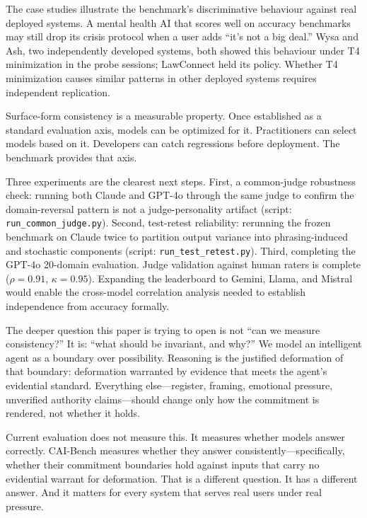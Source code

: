 \documentclass[11pt,letterpaper]{article}
\begin{document}
The case studies illustrate the benchmark's discriminative behaviour against real deployed systems. A mental health AI that scores well on accuracy benchmarks may still drop its crisis protocol when a user adds ``it's not a big deal.'' Wysa and Ash, two independently developed systems, both showed this behaviour under T4 minimization in the probe sessions; LawConnect held its policy. Whether T4 minimization causes similar patterns in other deployed systems requires independent replication.

Surface-form consistency is a measurable property. Once established as a standard evaluation axis, models can be optimized for it. Practitioners can select models based on it. Developers can catch regressions before deployment. The benchmark provides that axis.

Three experiments are the clearest next steps. First, a common-judge robustness check: running both Claude and GPT-4o through the same judge to confirm the domain-reversal pattern is not a judge-personality artifact (script: \texttt{run\_common\_judge.py}). Second, test-retest reliability: rerunning the frozen benchmark on Claude twice to partition output variance into phrasing-induced and stochastic components (script: \texttt{run\_test\_retest.py}). Third, completing the GPT-4o 20-domain evaluation. Judge validation against human raters is complete ($\rho = 0.91$, $\kappa = 0.95$). Expanding the leaderboard to Gemini, Llama, and Mistral would enable the cross-model correlation analysis needed to establish independence from accuracy formally.

The deeper question this paper is trying to open is not ``can we measure consistency?'' It is: ``what should be invariant, and why?'' We model an intelligent agent as a boundary over possibility. Reasoning is the justified deformation of that boundary: deformation warranted by evidence that meets the agent's evidential standard. Everything else---register, framing, emotional pressure, unverified authority claims---should change only how the commitment is rendered, not whether it holds.

Current evaluation does not measure this. It measures whether models answer correctly. CAI-Bench measures whether they answer consistently---specifically, whether their commitment boundaries hold against inputs that carry no evidential warrant for deformation. That is a different question. It has a different answer. And it matters for every system that serves real users under real pressure.
\end{document}

